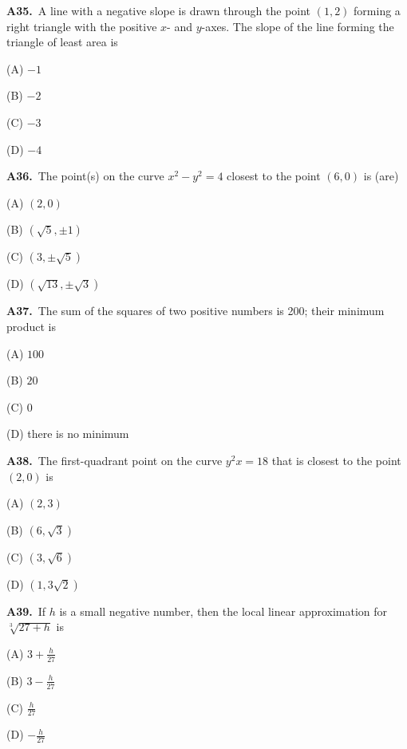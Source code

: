 \documentclass[11pt]{article}
\begin{document}
\bigskip\noindent\textbf{A35.}\ A line with a negative slope is drawn through the point $(1,2)$ forming a right triangle with the positive $x$- and $y$-axes. The slope of the line forming the triangle of least area is
\begin{list}{}{\setlength{\leftmargin}{3em}\setlength{\labelwidth}{2.5em}\setlength{\itemsep}{0pt}\setlength{\topsep}{2pt}}
\item[(A)] $-1$
\item[(B)] $-2$
\item[(C)] $-3$
\item[(D)] $-4$
\end{list}

\bigskip\noindent\textbf{A36.}\ The point(s) on the curve $x^2-y^2=4$ closest to the point $(6,0)$ is (are)
\begin{list}{}{\setlength{\leftmargin}{3em}\setlength{\labelwidth}{2.5em}\setlength{\itemsep}{0pt}\setlength{\topsep}{2pt}}
\item[(A)] $(2,0)$
\item[(B)] $(\sqrt5,\pm1)$
\item[(C)] $(3,\pm\sqrt5)$
\item[(D)] $(\sqrt{13},\pm\sqrt3)$
\end{list}

\bigskip\noindent\textbf{A37.}\ The sum of the squares of two positive numbers is 200; their minimum product is
\begin{list}{}{\setlength{\leftmargin}{3em}\setlength{\labelwidth}{2.5em}\setlength{\itemsep}{0pt}\setlength{\topsep}{2pt}}
\item[(A)] $100$
\item[(B)] $20$
\item[(C)] $0$
\item[(D)] there is no minimum
\end{list}

\bigskip\noindent\textbf{A38.}\ The first-quadrant point on the curve $y^2x = 18$ that is closest to the point $(2,0)$ is
\begin{list}{}{\setlength{\leftmargin}{3em}\setlength{\labelwidth}{2.5em}\setlength{\itemsep}{0pt}\setlength{\topsep}{2pt}}
\item[(A)] $(2,3)$
\item[(B)] $(6,\sqrt3)$
\item[(C)] $(3,\sqrt6)$
\item[(D)] $(1,3\sqrt2)$
\end{list}

\bigskip\noindent\textbf{A39.}\ If $h$ is a small negative number, then the local linear approximation for $\sqrt[3]{27+h}$ is
\begin{list}{}{\setlength{\leftmargin}{3em}\setlength{\labelwidth}{2.5em}\setlength{\itemsep}{0pt}\setlength{\topsep}{2pt}}
\item[(A)] $3+\frac h{27}$
\item[(B)] $3-\frac h{27}$
\item[(C)] $\frac h{27}$
\item[(D)] $-\frac h{27}$
\end{list}
\end{document}
